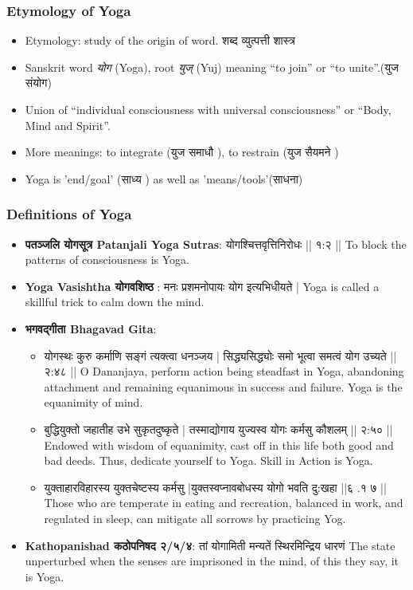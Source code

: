 \begin{frame}[fragile]\frametitle{Etymology of Yoga}

      \begin{itemize}
		\item Etymology: study of the origin of word. शब्द व्युत्पत्ती शास्त्र 
		\item Sanskrit word \textit{योग} (Yoga), root \textit{युज्} (Yuj) meaning “to join” or “to unite”.(युज संयोग)
		\item Union of ``individual consciousness with universal consciousness'' or ``Body, Mind and Spirit''.
		\item More meanings: to integrate (युज समाधौ ), to restrain (युज सैयमने )
		\item Yoga is 'end/goal' (साध्य ) as well as 'means/tools'(साधना)
	  \end{itemize}

\end{frame}

\begin{frame}[fragile]\frametitle{Definitions of Yoga}
      \begin{itemize}
        \item \textbf{पतञ्जलि  योगसूत्र  Patanjali Yoga Sutras}:      योगश्चित्तवृत्तिनिरोधः || १:२ || To block the patterns of consciousness is Yoga.
        \item \textbf{Yoga Vasishtha योगवशिष्ठ }:          मनः प्रशमनोपायः योग इत्यभिधीयते | Yoga is called a skillful trick to calm down the mind.
        \item \textbf{भगवद्गीता  Bhagavad Gita}:         
		      \begin{itemize}
				\item  योगस्थः कुरु कर्माणि सङ्गं त्यक्त्वा धनञ्जय |   सिद्ध्यसिद्ध्योः समो भूत्वा समत्वं योग उच्यते || २:४८ || O Dananjaya, perform action being steadfast in Yoga, abandoning attachment and remaining equanimous in success and failure. Yoga is the equanimity of mind.
				\item बुद्धियुक्तो जहातीह उभे सुकृतदुष्कृते |      तस्माद्योगाय युज्यस्व योगः कर्मसु कौशलम् || २:५० || Endowed with wisdom of equanimity, cast off in this life both good and bad deeds. Thus, dedicate yourself to Yoga. Skill in Action is Yoga.
				\item युक्ताहारविहारस्य युक्तचेष्टस्य कर्मसु |युक्तस्वप्नावबोधस्य योगो भवति दु:खहा ||६ .१ ७ || Those who are temperate in eating and recreation, balanced in work, and regulated in sleep, can mitigate all sorrows by practicing Yog.
				\end{itemize}
		\item \textbf{Kathopanishad कठोपनिषद २/५/४}: तां योगामिती मन्यतें स्थिरमिन्द्रिय धारणं The state unperturbed when the senses are imprisoned in the mind, of this they say, it is Yoga.
      \end{itemize}
\end{frame}

